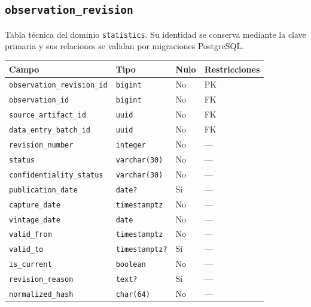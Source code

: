 \documentclass[11pt]{article}
\begin{document}
\subsection{\texttt{observation\_revision}}
Tabla técnica del dominio \texttt{statistics}. Su identidad se conserva mediante la clave primaria y sus relaciones se validan por migraciones PostgreSQL.
\begin{longtable}{>{\raggedright\arraybackslash}p{} p{} p{} p{}}
\toprule Campo & Tipo & Nulo & Restricciones \\ \midrule\endhead
\texttt{observation\_revision\_id} & \texttt{bigint} & No & PK \\
\texttt{observation\_id} & \texttt{bigint} & No & FK \\
\texttt{source\_artifact\_id} & \texttt{uuid} & No & FK \\
\texttt{data\_entry\_batch\_id} & \texttt{uuid} & No & FK \\
\texttt{revision\_number} & \texttt{integer} & No & --- \\
\texttt{status} & \texttt{varchar(30)} & No & --- \\
\texttt{confidentiality\_status} & \texttt{varchar(30)} & No & --- \\
\texttt{publication\_date} & \texttt{date?} & Sí & --- \\
\texttt{capture\_date} & \texttt{timestamptz} & No & --- \\
\texttt{vintage\_date} & \texttt{date} & No & --- \\
\texttt{valid\_from} & \texttt{timestamptz} & No & --- \\
\texttt{valid\_to} & \texttt{timestamptz?} & Sí & --- \\
\texttt{is\_current} & \texttt{boolean} & No & --- \\
\texttt{revision\_reason} & \texttt{text?} & Sí & --- \\
\texttt{normalized\_hash} & \texttt{char(64)} & No & --- \\
\bottomrule\end{longtable}
\end{document}
